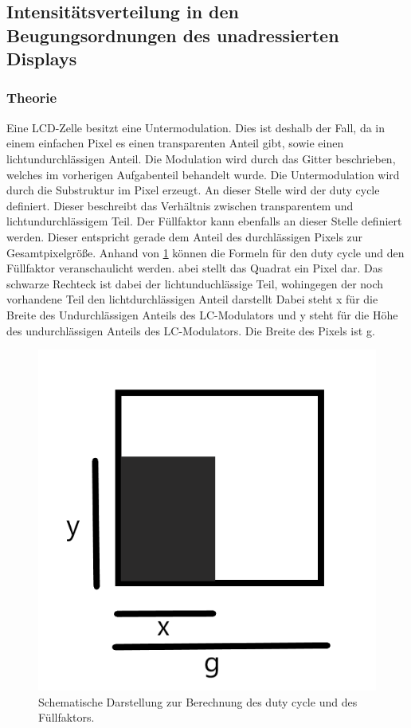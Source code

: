 \subsection{Intensitätsverteilung in den Beugungsordnungen des unadressierten Displays}
\subsubsection{Theorie}
Eine LCD-Zelle besitzt eine Untermodulation. Dies ist deshalb der Fall, da in einem einfachen Pixel es einen transparenten Anteil gibt, sowie einen lichtundurchlässigen Anteil. Die Modulation wird durch das Gitter beschrieben, welches im vorherigen Aufgabenteil behandelt wurde. Die Untermodulation wird durch die Substruktur im Pixel erzeugt. An dieser Stelle wird der duty cycle definiert. Dieser beschreibt das Verhältnis zwischen transparentem und lichtundurchlässigem Teil. Der Füllfaktor kann ebenfalls an dieser Stelle definiert werden. Dieser entspricht gerade dem Anteil des durchlässigen Pixels zur Gesamtpixelgröße.
Anhand von \cref{gesh} können die Formeln für den duty cycle und den Füllfaktor veranschaulicht werden. abei stellt das Quadrat ein Pixel dar. Das schwarze Rechteck ist dabei der lichtunduchlässige Teil, wohingegen der noch vorhandene Teil den lichtdurchlässigen Anteil darstellt
Dabei steht x für die Breite des Undurchlässigen Anteils des LC-Modulators und y steht für die Höhe des undurchlässigen Anteils des LC-Modulators.
Die Breite des Pixels ist g.
\begin{figure}[h!]
	\centering
	\includegraphics[scale = 1]{dutyyy.png}
	\caption{Schematische Darstellung zur Berechnung des duty cycle und des Füllfaktors.}
	\label{gesh}
\end{figure}
